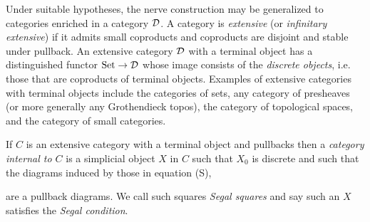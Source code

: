 \documentclass[a4paper]{amsart}
\begin{document}
Under suitable hypotheses, the nerve construction may be generalized to categories enriched in a category $\mathcal D$. 
A category is {\em extensive} (or {\em infinitary extensive}) if it admits small coproducts and coproducts are disjoint and stable under pullback. An extensive category $\mathcal D$ with a terminal object has a distinguished functor $\mathrm{Set} \to \mathcal D$ whose image consists of the {\em discrete objects}, i.e. those that are coproducts of terminal objects. Examples of extensive categories with terminal objects include the categories of sets, any category of presheaves (or more generally any Grothendieck topos), the category of topological spaces, and the category of small categories. 

\begin{definition}
	If $C$ is an extensive category with a terminal object and pullbacks then a {\em category internal to $C$} is a simplicial object $X$ in $C$ such that $X_0$ is discrete and such that the diagrams induced by those in equation (S),
	\begin{center}
	\end{center}
	are a pullback diagrams. We call such squares {\em Segal squares} and say such an $X$ satisfies the {\em Segal condition}. 
\end{definition}
\end{document}

